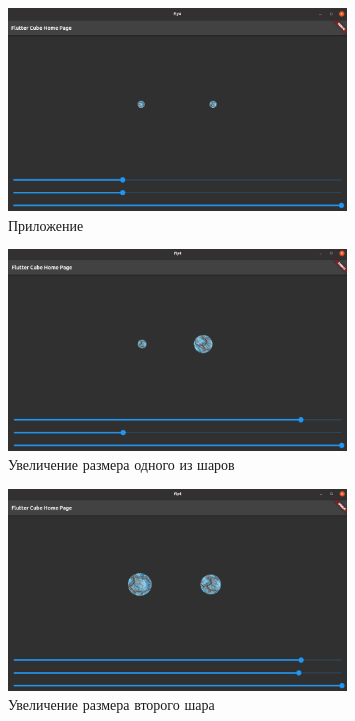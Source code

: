 \documentclass[a4paper, 14pt]{extarticle}
\begin{document}
\begin{figure}[!htb]
	\centering
	\includegraphics[width=0.8\textwidth]{img1}
\caption{Приложение}
\label{fig:img1}
\end{figure}

\begin{figure}[!htb]
	\centering
	\includegraphics[width=0.8\textwidth]{img2}
\caption{Увеличение размера одного из шаров}
\label{fig:img2}
\end{figure}

\begin{figure}[!htb]
	\centering
	\includegraphics[width=0.8\textwidth]{img3}
\caption{Увеличение размера второго шара}
\label{fig:img3}
\end{figure}
\end{document}
